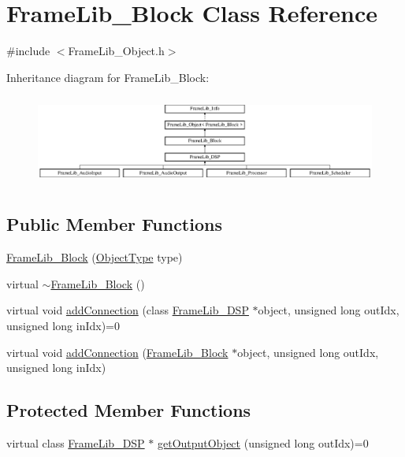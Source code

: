 \hypertarget{class_frame_lib___block}{}\section{Frame\+Lib\+\_\+\+Block Class Reference}
\label{class_frame_lib___block}


{\ttfamily \#include $<$Frame\+Lib\+\_\+\+Object.\+h$>$}

Inheritance diagram for Frame\+Lib\+\_\+\+Block\+:\begin{figure}[H]
\begin{center}
\leavevmode
\includegraphics[height=3.017241cm]{class_frame_lib___block}
\end{center}
\end{figure}
\subsection*{Public Member Functions}
\begin{DoxyCompactItemize}
\item 
\hyperlink{class_frame_lib___block_ab56169e5918fe77c1cfa7ddd0a6520a3}{Frame\+Lib\+\_\+\+Block} (\hyperlink{_frame_lib___types_8h_a842c5e2e69277690b064bf363c017980}{Object\+Type} type)
\item 
virtual \hyperlink{class_frame_lib___block_a17c0048595334cb8d63abfcbb77c980d}{$\sim$\+Frame\+Lib\+\_\+\+Block} ()
\item 
virtual void \hyperlink{class_frame_lib___block_a58ad49f15453e8214a298ef0992b00a1}{add\+Connection} (class \hyperlink{class_frame_lib___d_s_p}{Frame\+Lib\+\_\+\+D\+SP} $\ast$object, unsigned long out\+Idx, unsigned long in\+Idx)=0
\item 
virtual void \hyperlink{class_frame_lib___block_a88e998ec661b9afd001e40e68bb52f61}{add\+Connection} (\hyperlink{class_frame_lib___block}{Frame\+Lib\+\_\+\+Block} $\ast$object, unsigned long out\+Idx, unsigned long in\+Idx)
\end{DoxyCompactItemize}
\subsection*{Protected Member Functions}
\begin{DoxyCompactItemize}
\item 
virtual class \hyperlink{class_frame_lib___d_s_p}{Frame\+Lib\+\_\+\+D\+SP} $\ast$ \hyperlink{class_frame_lib___block_a9e8bb5dcd9954618de9a8e3ad27c16a9}{get\+Output\+Object} (unsigned long out\+Idx)=0
\end{DoxyCompactItemize}
